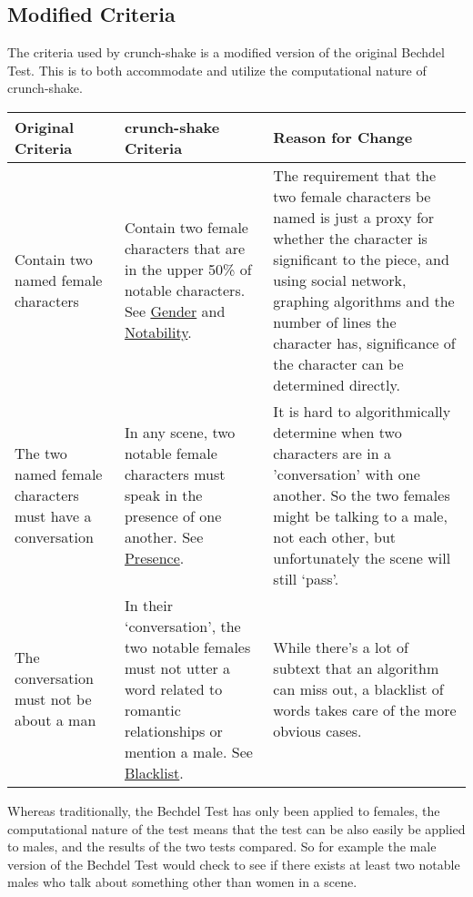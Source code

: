 \documentclass[12pt]{article}
\begin{document}
\subsection{Modified Criteria}
\label{sub:crunch_shake_s_new_criteria}
The criteria used by crunch-shake is a modified version of the original
Bechdel Test. This is to both accommodate and utilize the computational nature
of crunch-shake. 
\begin{center}
    \begin{tabularx}{\textwidth}{ X X X }
    \toprule
    Original Criteria & crunch-shake Criteria & Reason for Change \\ \midrule
        Contain two named female characters & Contain two female characters
        that are in the upper 50\% of notable characters. See
        \hyperref[sub:gender]{Gender} and
        \hyperref[sub:notability]{Notability}.
        & The requirement that the two female characters be named is just a
        proxy for whether the character is significant to the piece, and using
        social network, graphing algorithms and the number of lines the
        character has, significance of the character can be determined directly.
        \\ \hline
    The two named female characters must have a conversation & In any scene,
        two notable female characters must speak in the presence of one
        another.
        See \hyperref[sub:presence]{Presence}.
        & It is hard to algorithmically determine when two characters are in a
        'conversation' with one another. So the two females might be talking to
        a male, not each other, but unfortunately the scene will still
        `pass'. \\ \hline
    The conversation must not be about a man & In their `conversation', the two
        notable females must not utter a word related to romantic relationships
        or mention a male. See \hyperref[sub:blacklist]{Blacklist}. & While
        there's a lot of subtext that an algorithm can miss out, a blacklist of
        words takes care of the more obvious
        cases. \\
    \bottomrule
    \end{tabularx}
\end{center}
Whereas traditionally, the Bechdel Test
has only been applied to females, the computational nature of the test means
that the test can be also easily be applied to males, and the results of the
two tests compared. So for example the male version of the Bechdel Test would
check to see if there exists at least two notable males who talk about
something other than women in a scene. 
\end{document}
